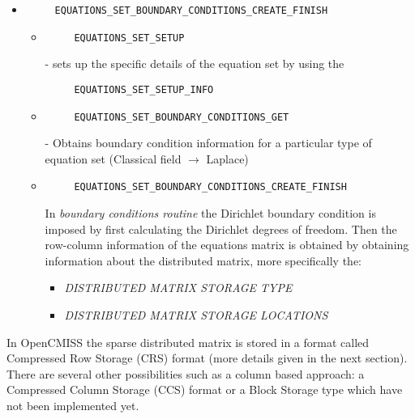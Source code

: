 \begin{itemize}
\item \begin{verbatim}
     EQUATIONS_SET_BOUNDARY_CONDITIONS_CREATE_FINISH
    \end{verbatim} 
    \begin{itemize}
     \item  \begin{verbatim}
     EQUATIONS_SET_SETUP
    \end{verbatim} - sets up the specific details of the equation set by using the  \begin{verbatim}
     EQUATIONS_SET_SETUP_INFO
     \end{verbatim}
    \item  \begin{verbatim}
     EQUATIONS_SET_BOUNDARY_CONDITIONS_GET
    \end{verbatim} - Obtains boundary condition information for a particular type of equation set (Classical field $\rightarrow$ Laplace)
    \item \begin{verbatim}
     EQUATIONS_SET_BOUNDARY_CONDITIONS_CREATE_FINISH
    \end{verbatim} 
In \emph{boundary conditions routine}
 the Dirichlet boundary condition is imposed by first calculating the Dirichlet degrees of freedom. 
Then the row-column information of the equations matrix is obtained by obtaining information about the distributed matrix, 
more specifically the:
 
\begin{itemize}
 \item \emph{DISTRIBUTED MATRIX STORAGE TYPE}  
 \item \emph{DISTRIBUTED MATRIX STORAGE LOCATIONS}

\end{itemize}

\end{itemize}

\end{itemize}
 

 In OpenCMISS the sparse distributed matrix is stored in a format called Compressed Row Storage (CRS) format 
(more details given in the next section). There are several other possibilities such as a column based approach: a Compressed Column Storage (CCS) format or a Block Storage type which have not been implemented yet. 

